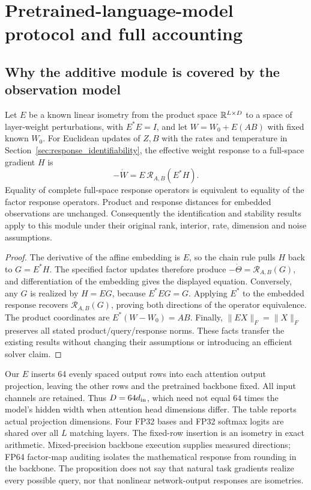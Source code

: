 \section{Pretrained-language-model protocol and full accounting}
\label{app:llm-study}

\subsection{Why the additive module is covered by the observation model}

\begin{proposition}
\label{prop:llm-embedding}
Let $E$ be a known linear isometry from the product space
$\mathbb{R}^{L\times D}$ to a space of layer-weight perturbations, with
$E^*E=I$, and let $W=W_0+E(AB)$ with fixed known $W_0$.
For Euclidean updates of $Z,B$ with the rates and temperature in
Section~\ref{sec:response_identifiability}, the effective weight response
 to a full-space gradient $H$ is
\[
 -\dot W=E\,\mathcal R_{A,B}(E^*H).
\]
Equality of complete full-space response operators is equivalent to
 equality of the factor response operators. Product and response distances
 for embedded observations are unchanged. Consequently the identification
 and stability results apply to this module under their original rank,
 interior, rate, dimension and noise assumptions.
\end{proposition}
\begin{proof}
The derivative of the affine embedding is $E$, so the chain rule pulls
$H$ back to $G=E^*H$. The specified factor updates therefore produce
$-\dot\Theta=\mathcal R_{A,B}(G)$, and differentiation of the embedding
 gives the displayed equation. Conversely, any $G$ is realized by $H=EG$,
 because $E^*EG=G$. Applying $E^*$ to the embedded response recovers
$\mathcal R_{A,B}(G)$, proving both directions of the operator equivalence.
The product coordinates are $E^*(W-W_0)=AB$. Finally,
$\|EX\|_F=\|X\|_F$ preserves all stated product/query/response norms.
These facts transfer the existing results without changing their
 assumptions or introducing an efficient solver claim.
\end{proof}

Our $E$ inserts 64 evenly spaced output rows into each attention output
projection, leaving the other rows and the pretrained backbone fixed.
All input channels are retained. Thus $D=64d_{\rm in}$, which need not
 equal $64$ times the model's hidden width when attention head dimensions
 differ. The table reports actual projection dimensions. Four FP32 bases
 and FP32 softmax logits are shared over all $L$ matching layers. The
 fixed-row insertion is an isometry in exact arithmetic. Mixed-precision
 backbone execution supplies measured directions; FP64 factor-map auditing
 isolates the mathematical response from rounding in the backbone.
The proposition does not say that natural task gradients realize every
 possible query, nor that nonlinear network-output responses are isometries.

